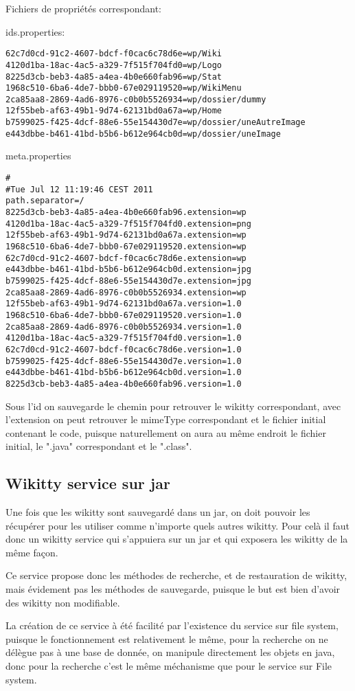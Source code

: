 Fichiers de propriétés correspondant:


ids.properties:
\begin{verbatim}
62c7d0cd-91c2-4607-bdcf-f0cac6c78d6e=wp/Wiki
4120d1ba-18ac-4ac5-a329-7f515f704fd0=wp/Logo
8225d3cb-beb3-4a85-a4ea-4b0e660fab96=wp/Stat
1968c510-6ba6-4de7-bbb0-67e029119520=wp/WikiMenu
2ca85aa8-2869-4ad6-8976-c0b0b5526934=wp/dossier/dummy
12f55beb-af63-49b1-9d74-62131bd0a67a=wp/Home
b7599025-f425-4dcf-88e6-55e154430d7e=wp/dossier/uneAutreImage
e443dbbe-b461-41bd-b5b6-b612e964cb0d=wp/dossier/uneImage
\end{verbatim}


meta.properties
\begin{verbatim}
#
#Tue Jul 12 11:19:46 CEST 2011
path.separator=/
8225d3cb-beb3-4a85-a4ea-4b0e660fab96.extension=wp
4120d1ba-18ac-4ac5-a329-7f515f704fd0.extension=png
12f55beb-af63-49b1-9d74-62131bd0a67a.extension=wp
1968c510-6ba6-4de7-bbb0-67e029119520.extension=wp
62c7d0cd-91c2-4607-bdcf-f0cac6c78d6e.extension=wp
e443dbbe-b461-41bd-b5b6-b612e964cb0d.extension=jpg
b7599025-f425-4dcf-88e6-55e154430d7e.extension=jpg
2ca85aa8-2869-4ad6-8976-c0b0b5526934.extension=wp
12f55beb-af63-49b1-9d74-62131bd0a67a.version=1.0
1968c510-6ba6-4de7-bbb0-67e029119520.version=1.0
2ca85aa8-2869-4ad6-8976-c0b0b5526934.version=1.0
4120d1ba-18ac-4ac5-a329-7f515f704fd0.version=1.0
62c7d0cd-91c2-4607-bdcf-f0cac6c78d6e.version=1.0
b7599025-f425-4dcf-88e6-55e154430d7e.version=1.0
e443dbbe-b461-41bd-b5b6-b612e964cb0d.version=1.0
8225d3cb-beb3-4a85-a4ea-4b0e660fab96.version=1.0
\end{verbatim}


Sous l'id on sauvegarde le chemin pour retrouver le wikitty correspondant, 
avec l'extension on peut retrouver le mimeType correspondant et le fichier
initial contenant le code, puisque naturellement on aura au même endroit
le fichier initial, le ".java" correspondant et le ".class". 

\subsection{Wikitty service sur jar}

Une fois que les wikitty sont sauvegardé dans un jar, on doit pouvoir les 
récupérer pour les utiliser comme n'importe quels autres wikitty. Pour celà il 
faut donc un wikitty service qui s'appuiera sur un jar et qui exposera les 
wikitty de la même façon.

Ce service propose donc les méthodes de recherche, et de restauration de wikitty,
mais évidement pas les méthodes de sauvegarde, puisque le but est bien d'avoir
des wikitty non modifiable.

La création de ce service à été facilité par l'existence du service sur file
system, puisque le fonctionnement est relativement le même, pour la recherche
on ne délègue pas à une base de donnée, on manipule directement les objets en
java, donc pour la recherche c'est le même méchanisme que pour le service sur
File system.



